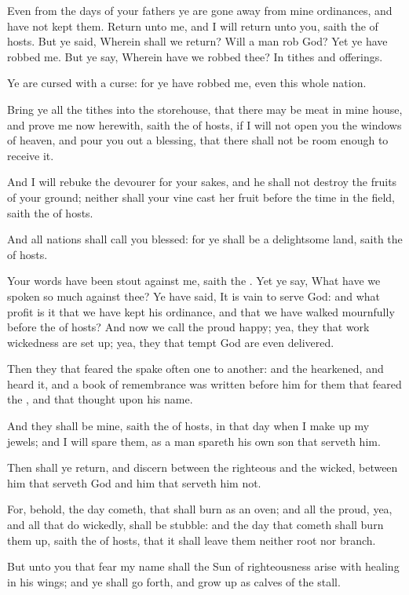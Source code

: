 \Verse Even from the days of your fathers ye are gone away from mine ordinances, and have not kept them. Return unto me, and I will return unto you, saith the \LORD of hosts. But ye said, Wherein shall we return?  \Verse Will a man rob God? Yet ye have robbed me. But ye say, Wherein have we robbed thee? In tithes and offerings.

\Verse Ye are cursed with a curse: for ye have robbed me, even this whole nation.

\Verse Bring ye all the tithes into the storehouse, that there may be meat in mine house, and prove me now herewith, saith the \LORD of hosts, if I will not open you the windows of heaven, and pour you out a blessing, that there shall not be room enough to receive it.

\Verse And I will rebuke the devourer for your sakes, and he shall not destroy the fruits of your ground; neither shall your vine cast her fruit before the time in the field, saith the \LORD of hosts.

\Verse And all nations shall call you blessed: for ye shall be a delightsome land, saith the \LORD of hosts.

\Verse Your words have been stout against me, saith the \LORD. Yet ye say, What have we spoken so much against thee?  \Verse Ye have said, It is vain to serve God: and what profit is it that we have kept his ordinance, and that we have walked mournfully before the \LORD of hosts?  \Verse And now we call the proud happy; yea, they that work wickedness are set up; yea, they that tempt God are even delivered.

\Verse Then they that feared the \LORD spake often one to another: and the \LORD hearkened, and heard it, and a book of remembrance was written before him for them that feared the \LORD, and that thought upon his name.

\Verse And they shall be mine, saith the \LORD of hosts, in that day when I make up my jewels; and I will spare them, as a man spareth his own son that serveth him.

\Verse Then shall ye return, and discern between the righteous and the wicked, between him that serveth God and him that serveth him not.


\Chapter
\Verse For, behold, the day cometh, that shall burn as an oven; and all the proud, yea, and all that do wickedly, shall be stubble: and the day that cometh shall burn them up, saith the \LORD of hosts, that it shall leave them neither root nor branch.

\Verse But unto you that fear my name shall the Sun of righteousness arise with healing in his wings; and ye shall go forth, and grow up as calves of the stall.

